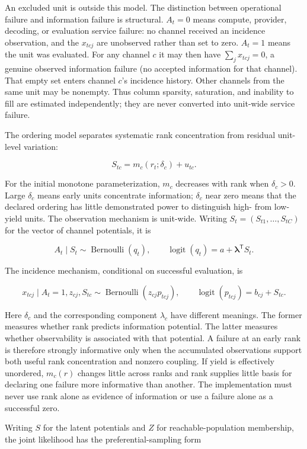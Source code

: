 \documentclass[11pt]{article}
\begin{document}
An excluded unit is outside this model.  The distinction between operational
failure and information failure is structural.  $A_t=0$ means compute,
provider, decoding, or evaluation service failure: no channel received an
incidence observation, and the $x_{tcj}$ are unobserved rather than set to
zero.  $A_t=1$ means the unit was evaluated.  For any channel $c$ it may then
have $\sum_j x_{tcj}=0$, a genuine observed information failure (no accepted
information for that channel).  That empty set enters channel $c$'s incidence
history.  Other channels from the same unit may be nonempty.  Thus column
sparsity, saturation, and inability to fill are estimated independently; they
are never converted into unit-wide service failure.

The ordering model separates systematic rank concentration from residual
unit-level variation:

\[
S_{tc}=m_c(r_t;\delta_c)+u_{tc}.
\]

For the initial monotone parameterization, $m_c$ decreases with rank when
$\delta_c>0$.  Large $\delta_c$ means early units concentrate information;
$\delta_c$ near zero means that the declared ordering has little demonstrated
power to distinguish high- from low-yield units.  The observation mechanism is
unit-wide.  Writing $S_t=(S_{t1},\ldots,S_{tC})$ for the vector of channel
potentials, it is

\[
A_t\mid S_t\sim\operatorname{Bernoulli}(q_t),\qquad
\operatorname{logit}(q_t)=a+\boldsymbol{\lambda}^{\mathsf T}S_t.
\]

The incidence mechanism, conditional on successful evaluation, is

\[
x_{tcj}\mid A_t=1,z_{cj},S_{tc}
\sim\operatorname{Bernoulli}(z_{cj}p_{tcj}),\qquad
\operatorname{logit}(p_{tcj})=b_{cj}+S_{tc}.
\]

Here $\delta_c$ and the corresponding component $\lambda_c$ have different
meanings.  The former measures
whether rank predicts information potential.  The latter measures whether
observability is associated with that potential.  A failure at an early rank
is therefore strongly informative only when the accumulated observations
support both useful rank concentration and nonzero coupling.  If yield is
effectively unordered, $m_c(r)$ changes little across ranks and rank supplies
little basis for declaring one failure more informative than another.  The
implementation must never use rank alone as evidence of information or use a
failure alone as a successful zero.

Writing $S$ for the latent potentials and $Z$ for reachable-population
membership, the joint likelihood has the preferential-sampling form
\end{document}
